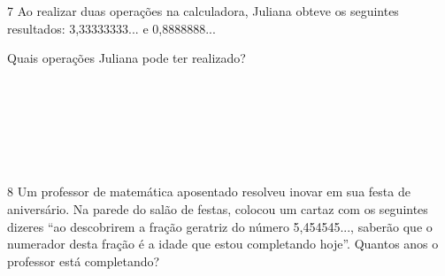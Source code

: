 
\num{7} Ao realizar duas operações na calculadora, Juliana obteve os
seguintes resultados: 3,33333333... e 0,8888888...

Quais operações Juliana pode ter realizado?

\\

\\

 \\

\\

\\

\\



\num{8} Um professor de matemática aposentado resolveu inovar em sua festa de
aniversário. Na parede do salão de festas, colocou um cartaz com os
seguintes dizeres ``ao descobrirem a fração geratriz do número
5,454545..., saberão que o numerador desta fração é a idade que estou
completando hoje''. Quantos anos o professor está completando?


\\

\\

\\

\\

\\




